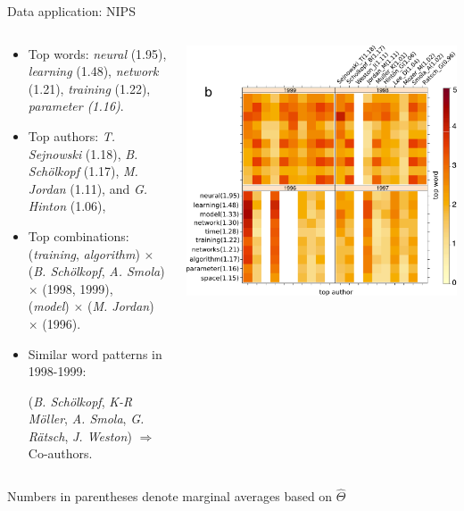 \documentclass[10pt, mathserif]{beamer} %
\theoremstyle{definition}
\theoremstyle{plain}
\begin{document}
\begin{frame}[label=result]{Data application: NIPS}
\begin{columns}
\begin{column}{0.5\textwidth} 
\scriptsize
\begin{itemize}
\item Top words: \emph{neural} (1.95), \emph{learning} (1.48), \emph{network} (1.21), \emph{training} (1.22), \emph{parameter (1.16)}.
\item Top authors: \emph{T. Sejnowski} (1.18), \emph{B. Sch\"{o}lkopf} (1.17), \emph{M. Jordan} (1.11), and \emph{G. Hinton} (1.06),
\item Top combinations: 
\\(\emph{\color{red}training}, \emph{\color{red}algorithm}) $\times$ (\emph{B. Sch\"{o}lkopf}, \emph{A. Smola}) $\times$ (1998, 1999), \\
(\emph{\color{blue}model}) $\times$ (\emph{M. Jordan}) $\times$ (1996).
\item Similar word patterns in 1998-1999:

(\emph{B. Sch\"{o}lkopf}, \emph{K-R M\"{o}ller}, \emph{A. Smola}, \emph{G. R\"{a}tsch}, \emph{J. Weston}) {\color{darkgreen}$\Rightarrow$ Co-authors}. 
\end{itemize}
\end{column}

\begin{column}{0.5\textwidth} 
\includegraphics[width=1\textwidth]{Figures/signal.pdf}
\end{column}
\end{columns}

\vspace{1cm}
{\hfill \scriptsize Numbers in parentheses denote marginal averages based on $\hat \Theta$\\
\hfill \hyperlink{NIPS}{}
}
\end{frame}
\end{document}
